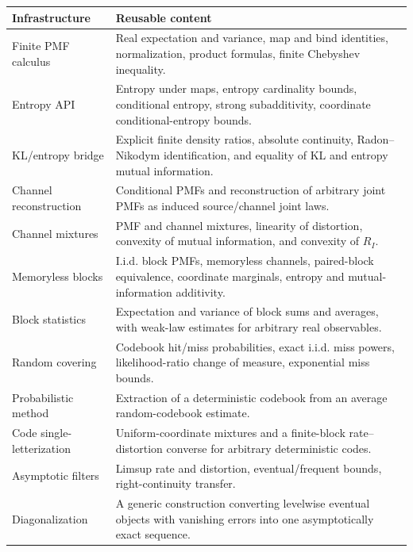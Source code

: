 \documentclass[11pt]{article}
\newcommand{\RD}{R_I}
\begin{document}
\begin{longtable}{>{\raggedright\arraybackslash}p{}
                  >{\raggedright\arraybackslash}p{}}
\toprule
Infrastructure & Reusable content \\
\midrule
\endhead
Finite PMF calculus & Real expectation and variance, map and bind identities,
normalization, product formulas, finite Chebyshev inequality. \\
\addlinespace
Entropy API & Entropy under maps, entropy cardinality bounds, conditional
entropy, strong subadditivity, coordinate conditional-entropy bounds. \\
\addlinespace
KL/entropy bridge & Explicit finite density ratios, absolute continuity,
Radon--Nikodym identification, and equality of KL and entropy mutual
information. \\
\addlinespace
Channel reconstruction & Conditional PMFs and reconstruction of arbitrary
joint PMFs as induced source/channel joint laws. \\
\addlinespace
Channel mixtures & PMF and channel mixtures, linearity of distortion,
convexity of mutual information, and convexity of $\RD$. \\
\addlinespace
Memoryless blocks & I.i.d. block PMFs, memoryless channels, paired-block
equivalence, coordinate marginals, entropy and mutual-information additivity. \\
\addlinespace
Block statistics & Expectation and variance of block sums and averages, with
weak-law estimates for arbitrary real observables. \\
\addlinespace
Random covering & Codebook hit/miss probabilities, exact i.i.d. miss powers,
likelihood-ratio change of measure, exponential miss bounds. \\
\addlinespace
Probabilistic method & Extraction of a deterministic codebook from an average
random-codebook estimate. \\
\addlinespace
Code single-letterization & Uniform-coordinate mixtures and a finite-block
rate--distortion converse for arbitrary deterministic codes. \\
\addlinespace
Asymptotic filters & Limsup rate and distortion, eventual/frequent bounds,
right-continuity transfer. \\
\addlinespace
Diagonalization & A generic construction converting levelwise eventual
objects with vanishing errors into one asymptotically exact sequence. \\
\bottomrule
\end{longtable}
\end{document}
